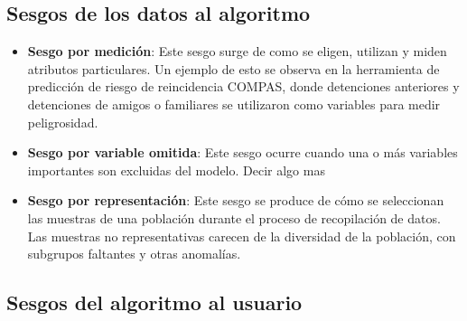     \subsection{Sesgos de los datos al algoritmo}
    
    \begin{itemize}
        \item \textbf{Sesgo por medici\'on}: Este sesgo surge de como se eligen, utilizan y miden atributos particulares. Un ejemplo de esto se observa 
        en la herramienta de predicci\'on de riesgo de reincidencia COMPAS, donde detenciones anteriores y detenciones de amigos o familiares se utilizaron 
        como variables para medir peligrosidad.
        
        \item \textbf{Sesgo por variable omitida}: Este sesgo ocurre cuando una o m\'as variables importantes son excluidas del modelo. Decir algo mas
        
        \item \textbf{Sesgo por representaci\'on}: Este sesgo se produce de c\'omo se seleccionan las muestras de una poblaci\'on durante el proceso de
        recopilaci\'on de datos. Las muestras no representativas carecen de la diversidad de la poblaci\'on, con subgrupos faltantes y otras anomal\'ias.
    \end{itemize}
    
    \subsection{Sesgos del algoritmo al usuario}

